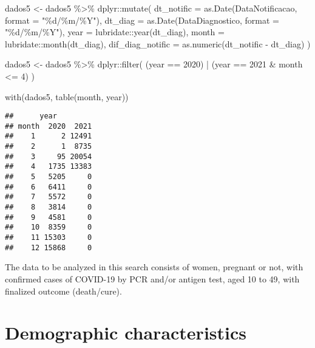 \documentclass[
]{article}
\newenvironment{Shaded}{\begin{snugshade}}{\end{snugshade}}
\newcommand{\AttributeTok}[1]{\textcolor[rgb]{0.77,0.63,0.00}{#1}}
\newcommand{\DecValTok}[1]{\textcolor[rgb]{0.00,0.00,0.81}{#1}}
\newcommand{\FunctionTok}[1]{\textcolor[rgb]{0.00,0.00,0.00}{#1}}
\newcommand{\NormalTok}[1]{#1}
\newcommand{\OtherTok}[1]{\textcolor[rgb]{0.56,0.35,0.01}{#1}}
\newcommand{\SpecialCharTok}[1]{\textcolor[rgb]{0.00,0.00,0.00}{#1}}
\newcommand{\StringTok}[1]{\textcolor[rgb]{0.31,0.60,0.02}{#1}}
\begin{document}
\begin{Shaded}
\begin{Highlighting}[]
\NormalTok{dados5 }\OtherTok{\textless{}{-}}\NormalTok{  dados5 }\SpecialCharTok{\%\textgreater{}\%}
\NormalTok{  dplyr}\SpecialCharTok{::}\FunctionTok{mutate}\NormalTok{(}
    \AttributeTok{dt\_notific =} \FunctionTok{as.Date}\NormalTok{(DataNotificacao, }\AttributeTok{format =} \StringTok{"\%d/\%m/\%Y"}\NormalTok{),}
    \AttributeTok{dt\_diag =} \FunctionTok{as.Date}\NormalTok{(DataDiagnostico, }\AttributeTok{format =} \StringTok{"\%d/\%m/\%Y"}\NormalTok{),}
    \AttributeTok{year =}\NormalTok{ lubridate}\SpecialCharTok{::}\FunctionTok{year}\NormalTok{(dt\_diag),}
    \AttributeTok{month =}\NormalTok{ lubridate}\SpecialCharTok{::}\FunctionTok{month}\NormalTok{(dt\_diag), }
    \AttributeTok{dif\_diag\_notific =} \FunctionTok{as.numeric}\NormalTok{(dt\_notific }\SpecialCharTok{{-}}\NormalTok{ dt\_diag)}
\NormalTok{  )}

\NormalTok{dados5 }\OtherTok{\textless{}{-}}\NormalTok{  dados5 }\SpecialCharTok{\%\textgreater{}\%}
\NormalTok{  dplyr}\SpecialCharTok{::}\FunctionTok{filter}\NormalTok{(}
\NormalTok{    (year }\SpecialCharTok{==}  \DecValTok{2020}\NormalTok{) }\SpecialCharTok{|}\NormalTok{ (year }\SpecialCharTok{==} \DecValTok{2021} \SpecialCharTok{\&}\NormalTok{ month }\SpecialCharTok{\textless{}=} \DecValTok{4}\NormalTok{)}
\NormalTok{  )}

\FunctionTok{with}\NormalTok{(dados5, }\FunctionTok{table}\NormalTok{(month, year))}
\end{Highlighting}
\end{Shaded}

\begin{verbatim}
##      year
## month  2020  2021
##    1      2 12491
##    2      1  8735
##    3     95 20054
##    4   1735 13383
##    5   5205     0
##    6   6411     0
##    7   5572     0
##    8   3814     0
##    9   4581     0
##    10  8359     0
##    11 15303     0
##    12 15868     0
\end{verbatim}

The data to be analyzed in this search consists of women, pregnant or
not, with confirmed cases of COVID-19 by PCR and/or antigen test, aged
10 to 49, with finalized outcome (death/cure).

\hypertarget{demographic-characteristics}{%
\section{Demographic
characteristics}\label{demographic-characteristics}}
\end{document}
